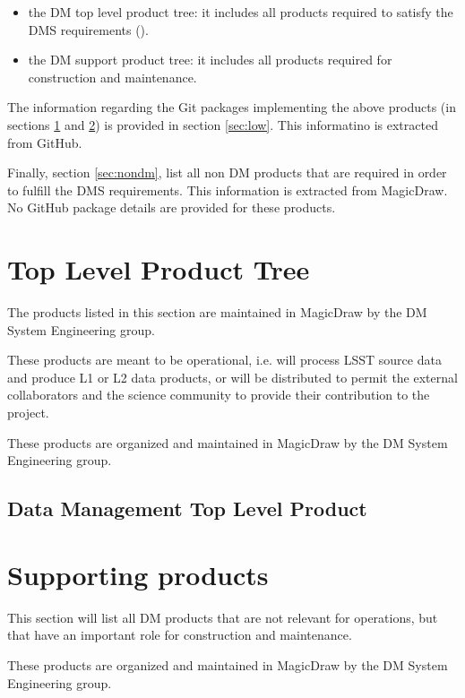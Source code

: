 \begin{itemize}
\item the DM top level product tree: it includes all products required to satisfy the DMS requirements ().
\item the DM support product tree: it includes all products required for construction and maintenance.
\end{itemize}

The information regarding the Git packages implementing the above products (in sections \ref{sec:top} and \ref{sec:sups}) is provided in section \ref{sec:low}. 
This informatino is extracted from GitHub.

Finally, section \ref{sec:nondm}, list all non DM products that are required in order to fulfill the DMS requirements.
This information is extracted from MagicDraw.
No GitHub package details are provided for these products. 

\newpage
\section{Top Level Product Tree}\label{sec:top}

The products listed in this section are maintained in MagicDraw by the DM System Engineering group. 

These products are meant to be operational, i.e. will process LSST source data and produce L1 or L2 data products, or will be distributed to permit the external collaborators and the science community to provide their contribution to the project.

These products are organized and maintained in MagicDraw by the DM System Engineering group.

\subsection{Data Management Top Level Product}\label{sec:dmtop}




\newpage
\section{Supporting products}\label{sec:sups}

This section will list all DM products that are not relevant for operations, but that have an important role for construction and maintenance.

These products are organized and maintained in MagicDraw by the DM System Engineering group.

